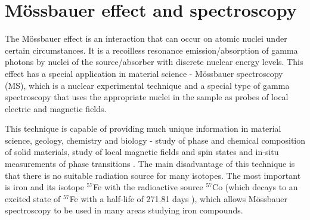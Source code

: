 
\chapter{Mössbauer effect and spectroscopy}
The Mössbauer effect is an interaction that can occur on atomic nuclei under certain circumstances. It is a recoilless resonance emission/absorption of gamma photons by nuclei of the source/absorber with discrete nuclear energy levels. This effect has a special application in material science - Mössbauer spectroscopy (MS), which is a nuclear experimental technique and a special type of gamma spectroscopy that uses the appropriate nuclei in the sample as probes of local electric and magnetic fields. 

\par
This technique is capable of providing much unique information in material science, geology, chemistry and biology - study of phase and chemical composition of solid materials, study of local magnetic fields and spin states and in-situ measurements of phase transitions \cite{moss}. The main disadvantage of this technique is that there is no suitable radiation source for many isotopes. The most important is iron and its isotope $^{57}$Fe with the radioactive source $^{57}$Co (which decays to an excited state of $^{57}$Fe with a half-life of 271.81 days \cite{co57}), which allows Mössbauer spectroscopy to be used in many areas studying iron compounds.
%

